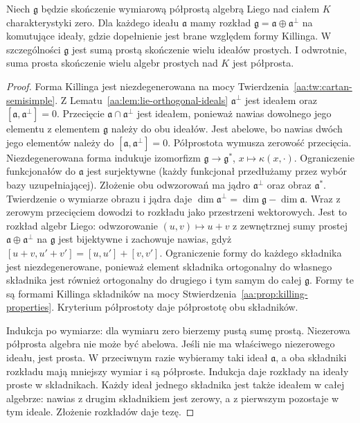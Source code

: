 \begin{twierdzenie}
\label{aa:tw:semisimple-decomposition}
Niech $\mathfrak g$ będzie skończenie wymiarową
półprostą algebrą Liego nad ciałem $K$ charakterystyki
zero. Dla każdego ideału $\mathfrak a$ mamy rozkład
$\mathfrak g=\mathfrak a\oplus\mathfrak a^\perp$
na komutujące ideały, gdzie dopełnienie jest
brane względem formy Killinga.
W szczególności $\mathfrak g$ jest sumą prostą
skończenie wielu ideałów prostych. I odwrotnie,
suma prosta skończenie wielu algebr prostych nad
$K$ jest półprosta.
\end{twierdzenie}
\begin{proof}
Forma Killinga jest niezdegenerowana na mocy
Twierdzenia~\ref{aa:tw:cartan-semisimple}.
Z Lematu~\ref{aa:lem:lie-orthogonal-ideals}
$\mathfrak a^\perp$ jest ideałem oraz
$[\mathfrak a,\mathfrak a^\perp]=0$.
Przecięcie $\mathfrak a\cap\mathfrak a^\perp$
jest ideałem, ponieważ nawias dowolnego jego
elementu z elementem $\mathfrak g$ należy do obu
ideałów. Jest abelowe, bo nawias dwóch jego
elementów należy do $[\mathfrak a,\mathfrak a^\perp]=0$.
Półprostota wymusza zerowość przecięcia.
Niezdegenerowana forma indukuje izomorfizm
$\mathfrak g\to\mathfrak g^*$, $x\mapsto\kappa(x,\cdot)$.
Ograniczenie funkcjonałów do $\mathfrak a$
jest surjektywne (każdy funkcjonał przedłużamy
przez wybór bazy uzupełniającej).
Złożenie obu odwzorowań ma jądro
$\mathfrak a^\perp$ oraz obraz $\mathfrak a^*$.
Twierdzenie o wymiarze obrazu i jądra daje
$\dim\mathfrak a^\perp=\dim\mathfrak g-\dim\mathfrak a$.
Wraz z zerowym przecięciem dowodzi to rozkładu
jako przestrzeni wektorowych. Jest to rozkład
algebr Liego: odwzorowanie
$(u,v)\mapsto u+v$ z zewnętrznej sumy prostej
$\mathfrak a\oplus\mathfrak a^\perp$ na $\mathfrak g$
jest bijektywne i zachowuje nawias, gdyż
$[u+v,u'+v']=[u,u']+[v,v']$.
Ograniczenie formy do każdego składnika jest
niezdegenerowane, ponieważ element składnika
ortogonalny do własnego składnika jest również
ortogonalny do drugiego i tym samym do całej
$\mathfrak g$. Formy te są formami Killinga
składników na mocy Stwierdzenia~\ref{aa:prop:killing-properties}.
Kryterium półprostoty daje półprostotę obu składników.

Indukcja po wymiarze: dla wymiaru zero bierzemy
pustą sumę prostą. Niezerowa półprosta algebra
nie może być abelowa. Jeśli nie ma właściwego
niezerowego ideału, jest prosta. W przeciwnym
razie wybieramy taki ideał $\mathfrak a$,
a oba składniki rozkładu mają mniejszy wymiar
i są półproste. Indukcja daje rozkłady na ideały
proste w składnikach. Każdy ideał jednego
składnika jest także ideałem w całej algebrze:
nawias z drugim składnikiem jest zerowy,
a z pierwszym pozostaje w tym ideale.
Złożenie rozkładów daje tezę.


\end{proof}
